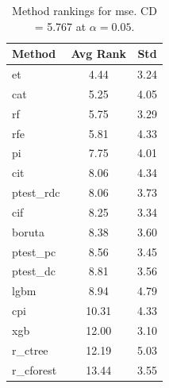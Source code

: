 \begin{table}[h]
\centering
\caption{Method rankings for mse. CD = 5.767 at $\alpha=0.05$.}
\label{tab:ranks_mse}
\begin{tabular}{lcc}
\toprule
Method & Avg Rank & Std \\
\midrule
et & 4.44 & 3.24 \\
cat & 5.25 & 4.05 \\
rf & 5.75 & 3.29 \\
rfe & 5.81 & 4.33 \\
pi & 7.75 & 4.01 \\
cit & 8.06 & 4.34 \\
ptest_rdc & 8.06 & 3.73 \\
cif & 8.25 & 3.34 \\
boruta & 8.38 & 3.60 \\
ptest_pc & 8.56 & 3.45 \\
ptest_dc & 8.81 & 3.56 \\
lgbm & 8.94 & 4.79 \\
cpi & 10.31 & 4.33 \\
xgb & 12.00 & 3.10 \\
r_ctree & 12.19 & 5.03 \\
r_cforest & 13.44 & 3.55 \\
\bottomrule
\end{tabular}
\end{table}